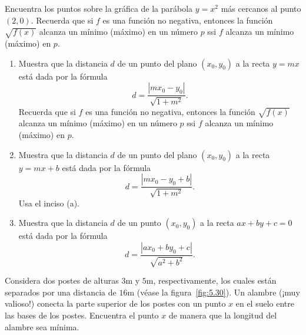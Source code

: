 \documentclass[12pt,a4paper]{book}
\begin{document}
    \begin{ejercicio}\label{ej:312}
        Encuentra los puntos sobre la gráfica de la parábola $y=x^{2}$
        más cercanos al punto $(2,0)$. \sugerencia Recuerda que si $f$ es una función
        no negativa, entonces la función $\sqrt{f(x)}$ alcanza un mínimo (máximo) en un
        número $p$ ssi $f$ alcanza un mínimo (máximo) en $p$.
    \end{ejercicio}

    \begin{ejercicio}\label{ej:313}
        \leavevmode
        \begin{enumerate}
            \item Muestra que la distancia $d$ de un punto del plano $(x_{0},y_{0})$ a la recta $y=mx$
            está dada por la fórmula
            \begin{equation*}
                d=\frac{|mx_{0}-y_{0}|}{\sqrt{1+m^{2}}}.
            \end{equation*}
            \sugerencia Recuerda que si $f$ es una función no negativa, entonces la
            función $\sqrt{f(x)}$ alcanza un mínimo (máximo) en un número $p$ ssi $f$ alcanza
            un mínimo (máximo) en $p$.
            \item Muestra que la distancia $d$ de un punto del plano $(x_{0},y_{0})$ a la recta $y=
            mx+b$ está dada por la fórmula
            \begin{equation*}
                d=\frac{|mx_{0}-y_{0}+b|}{\sqrt{1+m^{2}}}.
            \end{equation*}
            \sugerencia Usa el inciso (a).
            \item Muestra que la distancia $d$ de un punto $(x_{0},y_{0})$ a la recta $ax+by+c=0$
            está dada por la fórmula
            \begin{equation*}
                d=\frac{|ax_{0}+by_{0}+c|}{\sqrt{a^{2}+b^{2}}}.
            \end{equation*}
        \end{enumerate}
    \end{ejercicio}

    \begin{ejercicio}\label{ej:314}
        Considera dos postes de alturas $3$m y $5$m, respectivamente,
        los cuales están separados por una distancia de $16$m (véase la figura~\ref{fig:5.30}).
        Un alambre (¡muy valioso!) conecta la parte superior de los postes con un
        punto $x$ en el suelo entre las bases de los postes. Encuentra el punto $x$ de
        manera que la longitud del alambre sea mínima.
    \end{ejercicio}
\end{document}

